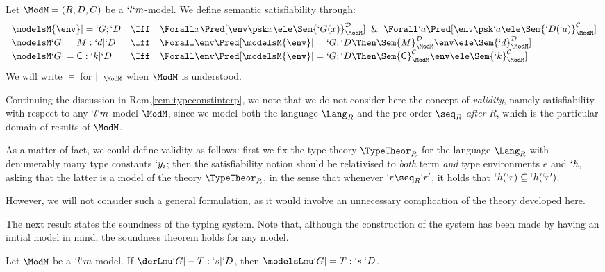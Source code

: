 \documentclass{CSML}
\begin{document}
 \begin{defi}[Satisfiability] \label{def:judegmentSat}
Let ${\ModM} = (R,D,C)$ be a $`l`m$-model.
We define semantic satisfiability through:
%
 \[ \def\arraystretch{1.2} \begin{array}{lcl}
 \modelsM {\env} |= `G;`D 
	& \Iff& 
 \Forall x \Pred[ \env \psk x \ele \Sem{`G(x)}_{\ModM}^{\mathcal D } ] \And	
 \Forall `a \Pred[ \env \psk `a \ele \Sem{ `D(`a) }_{\ModM}^{\mathcal C} ] 
 \\ 
 \modelsM `G |= M : `d | `D 
	& \Iff &	
 \Forall \env \Pred[ \modelsM {\env} |= `G;`D 
	\Then \Sem{ M }_{\ModM}^{\mathcal D }{ \env } \ele \Sem{`d}_{\ModM}^{\mathcal D } ] 
 \\ 
 \modelsM `G |= {\Cmd} : `k | `D 
	& \Iff &
 \Forall \env \Pred[ \modelsM {\env} |= `G;`D 
	\Then \Sem{ \Cmd}_{\ModM}^{\mathcal C }{ \env } \ele \Sem{ `k }_{\ModM}^{\mathcal C} ] 
 \end{array} \]
We will write $\models$ for $\models_{\ModM}$ when $\ModM$ is understood.
 \end{defi}

 \begin{rem} \label{rem:validity}
Continuing the discussion in Rem.\skp\ref{rem:typeconstinterp}, we note that we do not consider here the concept of \emph{validity}, namely satisfiability with respect to any $`l`m$-model $\ModM$, since we model both the language $\Lang_R$ and the pre-order $\seq_R$ \emph{after} $R$, which is the particular domain of results of $\ModM$. 

As a matter of fact, we could define validity as follows: first we fix the type theory $\TypeTheor_R$ for the language $\Lang_R$ with denumerably many type constants $`y_i$; then the satisfiability notion should be relativised to \emph{both} term \emph{and} type environments $e$ and $`h$, asking that the latter is a model of the theory $\TypeTheor_R$, in the sense that whenever $`r \seq_R `r'$, it holds that $`h(`r) \subseteq `h(`r')$.

However, we will not consider such a general formulation, as it would involve an unnecessary complication of the theory developed here.
 \end{rem}

The next result states the soundness of the typing system. 
Note that, although the construction of the system has been made by having an initial model in mind, the soundness theorem holds for any model.

 \begin{thm} \label{thm:typeAssSound}
Let $\ModM$ be a $`l`m$-model. 
If $ \derLmu `G |- T : `s | `D $, then $ \modelsLmu `G |= T : `s | `D $.
 \end{thm}
\end{document}
